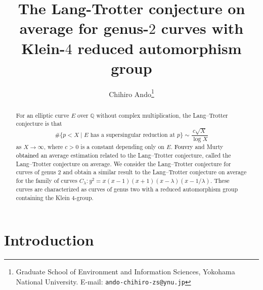 \documentclass[a4paper, 11pt]{article}
\title{The Lang-Trotter conjecture on average for genus-$2$ curves with Klein-$4$ reduced automorphism group }
\author{Chihiro Ando\thanks{Graduate School of Environment and Information Sciences, Yokohama National University.
E-mail: \texttt{ando-chihiro-zs@ynu.jp}}}
\theoremstyle{plain}
\newcommand{\?}{\textcolor{red}{??}}
\begin{document}
\maketitle


\begin{abstract}
    \noindent 
    For an elliptic curve $E$ over $\mathbb{Q}$ without complex multiplication, the Lang--Trotter conjecture is that
    \[
    \# \{ p<X \mid E \text{ has a supersingular reduction at } p \} \sim \frac{c\sqrt{X}}{\log X}
    \]
    as $X \rightarrow \infty$, where $c>0$ is a constant depending only on $E$. \textcolor{black}{Fouvry} and Murty \textcolor{black}{obtained} an average estimation related to the Lang--Trotter conjecture, called the Lang--Trotter conjecture on average. We consider the Lang--Trotter conjecture for curves of genus 2 and obtain a similar result to the Lang--Trotter conjecture on average for the family of curves $C_{\lambda}:y^2=x(x-1)(x+1)(x-{\lambda})(x-1/ \lambda)$. These curves are characterized as curves of genus two with a reduced automorphism group containing the Klein $4$-group. 
    
\end{abstract}

\section{Introduction}
\end{document}
